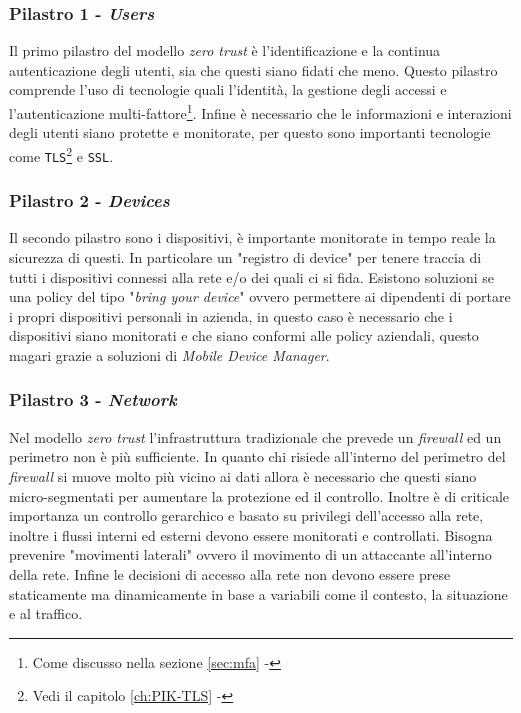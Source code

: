         \subsubsection{Pilastro 1 - \textit{Users}}
            Il primo pilastro del modello \textit{zero trust} è l'identificazione e la continua autenticazione degli utenti, sia che questi siano fidati che meno.\newline
            Questo pilastro comprende l'uso di tecnologie quali l'identità, la gestione degli accessi e l'autenticazione multi-fattore\footnote{Come discusso nella sezione \ref{sec:mfa} - }. Infine è necessario che le informazioni e interazioni degli utenti siano protette e monitorate, per questo sono importanti tecnologie come \texttt{TLS}\footnote{Vedi il capitolo \ref{ch:PIK-TLS} - } e \texttt{SSL}.
        \subsubsection{Pilastro 2 - \textit{Devices}}
            Il secondo pilastro sono i dispositivi, è importante monitorate in tempo reale la sicurezza di questi. In particolare un "registro di device" per tenere traccia di tutti i dispositivi connessi alla rete e/o dei quali ci si fida. Esistono soluzioni se una policy del tipo "\textit{bring your device}" ovvero permettere ai dipendenti di portare i propri dispositivi personali in azienda, in questo caso è necessario che i dispositivi siano monitorati e che siano conformi alle policy aziendali, questo magari grazie a soluzioni di \textit{Mobile Device Manager}.
        \subsubsection{Pilastro 3 - \textit{Network}}
            Nel modello \textit{zero trust} l'infrastruttura tradizionale che prevede un \textit{firewall} ed un perimetro non è più sufficiente. In quanto chi risiede all'interno del perimetro del \textit{firewall} si muove molto più vicino ai dati allora è necessario che questi siano micro-segmentati per aumentare la protezione ed il controllo. Inoltre è di criticale importanza un controllo gerarchico e basato su privilegi dell'accesso alla rete, inoltre i flussi interni ed esterni devono essere monitorati e controllati. Bisogna prevenire "movimenti laterali" ovvero il movimento di un attaccante all'interno della rete. Infine le decisioni di accesso alla rete non devono essere prese staticamente ma dinamicamente in base a variabili come il contesto, la situazione e al traffico.
